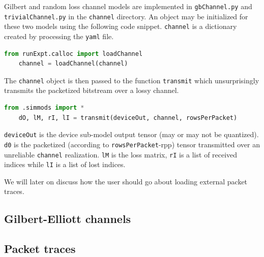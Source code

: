 Gilbert and random loss channel models are implemented in \verb|gbChannel.py| and \verb|trivialChannel.py| in the \verb|channel| directory. An object may be initialized for these two models using the following code snippet. \verb|channel| is a dictionary created by processing the \verb|yaml| file.

\begin{lstlisting}[language=Python,caption=Creating a lossy channel model object]
	from runExpt.calloc import loadChannel
	channel = loadChannel(channel)
\end{lstlisting}
The \verb|channel| object is then passed to the function \verb|transmit| which unsurprisingly transmits the packetized bitstream over a lossy channel.

\begin{lstlisting}[language=Python,caption=Lossy channel model]
	from .simmods import *
	dO, lM, rI, lI = transmit(deviceOut, channel, rowsPerPacket)
\end{lstlisting}

\verb|deviceOut| is the device sub-model output tensor (may or may not be quantized). \verb|d0| is the packetized (according to \verb|rowsPerPacket|-\gls{rpp}) tensor transmitted over an unreliable \verb|channel| realization. \verb|lM| is the loss matrix, \verb|rI| is a list of received indices while \verb|lI| is a list of lost indices.

We will later on discuss how the user should go about loading external packet traces.

\subsection{Gilbert-Elliott channels}

\subsection{Packet traces}

